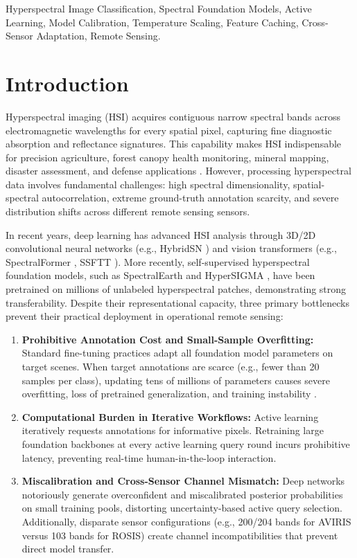 \documentclass[conference,letterpaper]{IEEEtran}
\begin{document}
\begin{IEEEkeywords}
Hyperspectral Image Classification, Spectral Foundation Models, Active Learning, Model Calibration, Temperature Scaling, Feature Caching, Cross-Sensor Adaptation, Remote Sensing.
\end{IEEEkeywords}

\section{Introduction}

Hyperspectral imaging (HSI) acquires contiguous narrow spectral bands across electromagnetic wavelengths for every spatial pixel, capturing fine diagnostic absorption and reflectance signatures. This capability makes HSI indispensable for precision agriculture, forest canopy health monitoring, mineral mapping, disaster assessment, and defense applications \cite{roy2020,tuia2016}. However, processing hyperspectral data involves fundamental challenges: high spectral dimensionality, spatial-spectral autocorrelation, extreme ground-truth annotation scarcity, and severe distribution shifts across different remote sensing sensors.

\vspace{0.3em}
In recent years, deep learning has advanced HSI analysis through 3D/2D convolutional neural networks (e.g., HybridSN \cite{roy2020}) and vision transformers (e.g., SpectralFormer \cite{hong2022}, SSFTT \cite{he2022}). More recently, self-supervised hyperspectral foundation models, such as SpectralEarth \cite{braham2025} and HyperSIGMA \cite{wang2025}, have been pretrained on millions of unlabeled hyperspectral patches, demonstrating strong transferability. Despite their representational capacity, three primary bottlenecks prevent their practical deployment in operational remote sensing:

\begin{enumerate}
    \item \textbf{Prohibitive Annotation Cost and Small-Sample Overfitting:} Standard fine-tuning practices adapt all foundation model parameters on target scenes. When target annotations are scarce (e.g., fewer than 20 samples per class), updating tens of millions of parameters causes severe overfitting, loss of pretrained generalization, and training instability \cite{camps2021}.
    \item \textbf{Computational Burden in Iterative Workflows:} Active learning iteratively requests annotations for informative pixels. Retraining large foundation backbones at every active learning query round incurs prohibitive latency, preventing real-time human-in-the-loop interaction.
    \item \textbf{Miscalibration and Cross-Sensor Channel Mismatch:} Deep networks notoriously generate overconfident and miscalibrated posterior probabilities on small training pools, distorting uncertainty-based active query selection. Additionally, disparate sensor configurations (e.g., 200/204 bands for AVIRIS versus 103 bands for ROSIS) create channel incompatibilities that prevent direct model transfer.
\end{enumerate}
\end{document}
